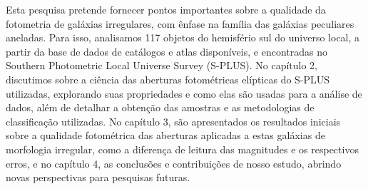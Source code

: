 Esta pesquisa pretende fornecer pontos importantes sobre a qualidade da fotometria de galáxias irregulares, com ênfase na família das galáxias peculiares aneladas. Para isso, analisamos 117 objetos do hemisfério sul do universo local, a partir da base de dados de catálogos e atlas disponíveis, e encontradas no Southern Photometric Local Universe Survey (S-PLUS). No capítulo 2, discutimos sobre a ciência das aberturas fotométricas elípticas do S-PLUS utilizadas, explorando suas propriedades e como elas são usadas para a análise de dados, além de detalhar a obtenção das amostras e as metodologias de classificação utilizadas. No capítulo 3, são apresentados os resultados iniciais sobre a qualidade fotométrica das aberturas aplicadas a estas galáxias de morfologia irregular, como a diferença de leitura das magnitudes e os respectivos erros, e no capítulo 4, as conclusões e contribuições de nosso estudo, abrindo novas perspectivas para pesquisas futuras.